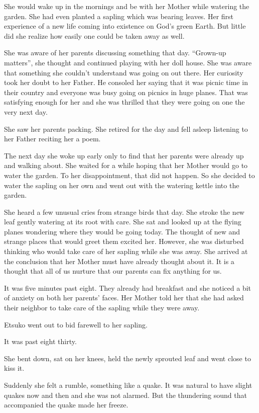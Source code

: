 \documentclass[twoside,11pt,titlepage]{article}
\begin{document}
She would wake up in the mornings and be with her Mother while watering the garden. She had even planted a sapling which was bearing leaves. Her first experience of a new life coming into existence on God's green Earth. But little did she realize how easily one could be taken away as well.

She was aware of her parents discussing something that day. ``Grown-up matters'', she thought and continued playing with her doll house. She was aware that something she couldn't understand was going on out there. Her curiosity took her doubt to her Father. He consoled her saying that it was picnic time in their country and everyone was busy going on picnics in huge planes. That was satisfying enough for her and she was thrilled that they were going on one the very next day.

She saw her parents packing. She retired for the day and fell asleep listening to her Father reciting her a poem.

The next day she woke up early only to find that her parents were already up and walking about. She waited for a while hoping that her Mother would go to water the garden. To her disappointment, that did not happen. So she decided to water the sapling on her own and went out with the watering kettle into the garden.

She heard a few unusual cries from strange birds that day. She stroke the new leaf gently watering at its root with care. She sat and looked up at the flying planes wondering where they would be going today. The thought of new and strange places that would greet them excited her. However, she was disturbed thinking who would take care of her sapling while she was away. She arrived at the conclusion that her Mother must have already thought about it. It is a thought that all of us nurture that our parents can fix anything for us.

It was five minutes past eight. They already had breakfast and she noticed a bit of anxiety on both her parents' faces. Her Mother told her that she had asked their neighbor to take care of the sapling while they were away.

 Etsuko went out to bid farewell to her sapling.

 It was past eight thirty.

 She bent down, sat on her knees, held the newly sprouted leaf and went close to kiss it.

Suddenly she felt a rumble, something like a quake. It was natural to have slight quakes now and then and she was not alarmed. But the thundering sound that accompanied the quake made her freeze.
\end{document}
